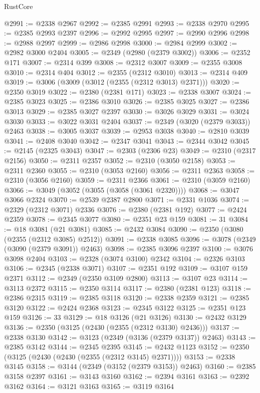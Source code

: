 \begin{lexlean}{RustCore}
\begin{coremodule}
@2991 := @2338 @2967
@2992 := @2385 @2991
@2993 := @2338 @2970
@2995 := @2385 @2993 @2397
@2996 := @2992 @2995
@2997 := @2990 @2996
@2998 := @2988 @2997
@2999 := @2986 @2998
@3000 := @2984 @2999
@3002 := @2982 @3000 @2404
@3005 := @2349 (@2980 (@2379 @3002))
@3006 := @2352 @171
@3007 := @2314 @399
@3008 := @2312 @3007
@3009 := @2355 @3008
@3010 := @2314 @404
@3012 := @2355 (@2312 @3010)
@3013 := @2314 @409
@3019 := @3006 (@3009 (@3012 (@2355 (@2312 @3013) @2371)))
@3020 := @2350 @3019
@3022 := @2380 (@2381 @171)
@3023 := @2338 @3007
@3024 := @2385 @3023
@3025 := @2386 @3010
@3026 := @2385 @3025
@3027 := @2386 @3013
@3029 := @2385 @3027 @2397
@3030 := @3026 @3029
@3031 := @3024 @3030
@3033 := @3022 @3031 @2404
@3037 := @2349 (@3020 (@2379 @3033)) @2463
@3038 := @3005 @3037
@3039 := @2953 @3038
@3040 := @2810 @3039
@3041 := @2408 @3040
@3042 := @2347 @3041
@3043 := @2344 @3042
@3045 := @2145 (@2325 @3043)
@3047 := @2303 (@2306 @23)
@3049 := @2310 (@2317 @2156)
@3050 := @2311 @2357
@3052 := @2310 (@3050 @2158)
@3053 := @2311 @2360
@3055 := @2310 (@3053 @2160)
@3056 := @2311 @2363
@3058 := @2310 (@3056 @2160)
@3059 := @2311 @2366
@3061 := @2310 (@3059 @2160)
@3066 := @3049 (@3052 (@3055 (@3058 (@3061 @2320))))
@3068 := @3047 @3066 @2324
@3070 := @2539 @2387 @2800
@3071 := @2331 @1036
@3074 := @2329 (@2312 @3071) @2336
@3076 := @2380 (@2381 @192)
@3077 := @2424 @2359
@3078 := @2345 @3077
@3080 := @2351 @23 @159
@3081 := 31
@3084 := @18 @3081 (@21 @3081)
@3085 := @2432 @3084
@3090 := @2350 (@3080 (@2355 (@2312 @3085) @2512))
@3091 := @2338 @3085
@3096 := @3078 (@2349 (@3090 (@2379 @3091)) @2463)
@3098 := @2385 @3096 @2397
@3100 := @3076 @3098 @2404
@3103 := @2328 (@3074 @3100) @2342
@3104 := @2326 @3103
@3106 := @2345 (@2338 @3071)
@3107 := @2351 @192
@3109 := @3107 @159 @2371
@3112 := @2349 (@2350 @3109 @2800)
@3113 := @3107 @23
@3114 := @3113 @2372
@3115 := @2350 @3114
@3117 := @2380 (@2381 @123)
@3118 := @2386 @2315
@3119 := @2385 @3118
@3120 := @2338 @2359
@3121 := @2385 @3120
@3122 := @2424 @2368
@3123 := @2345 @3122
@3125 := @2351 @123 @159
@3126 := 33
@3129 := @18 @3126 (@21 @3126)
@3130 := @2432 @3129
@3136 := @2350 (@3125 (@2430 (@2355 (@2312 @3130) @2436)))
@3137 := @2338 @3130
@3142 := @3123 (@2349 (@3136 (@2379 @3137)) @2463)
@3143 := @2385 @3142
@3144 := @2345 @2395
@3145 := @2432 @1123
@3152 := @2350 (@3125 (@2430 (@2430 (@2355 (@2312 @3145) @2371))))
@3153 := @2338 @3145
@3158 := @3144 (@2349 (@3152 (@2379 @3153)) @2463)
@3160 := @2385 @3158 @2397
@3161 := @3143 @3160
@3162 := @2394 @3161
@3163 := @2392 @3162
@3164 := @3121 @3163
@3165 := @3119 @3164

\end{coremodule}
\end{lexlean}
